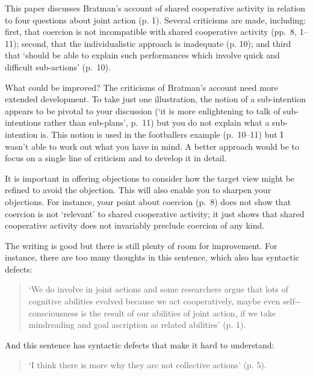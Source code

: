 \documentclass[12pt,a4paper]{extarticle}
\begin{document}
\setlength\footnotesep{1em}


\author{}
\date{}


\maketitle


This paper discusses Bratman’s account of shared cooperative activity in relation to four questions about joint action (p. 1).  
Several criticisms are made, including: first, that coercion is not  incompatible with shared cooperative activity (pp.\ 8, 1--11); second, that the individualistic approach is inadequate (p. 10); and third that ‘should be able to explain such performances which involve quick and difficult sub-actions’ (p.\ 10).

What could be improved? 
The criticisms of Bratman’s account need more extended development.
To take just one illustration, the notion of a sub-intention appears to be pivotal to your discussion (‘it is more enlightening to talk of sub-intentions rather than sub-plans’, p.\ 11) but you do not explain what a sub-intention is.
This notion is used in the footballers example (p.\ 10--11) but I wasn’t able to work out what you have in mind.
A better approach would be to focus on a single line of criticism and to develop it in detail.

It is important in offering objections to consider how the target view might be refined to avoid the objection.
This will also enable you to sharpen your objections.
For instance, your point about coercion (p.\ 8) does not show that coercion is not ‘relevant’ to shared cooperative activity; it just shows that shared cooperative activity does not invariably preclude coercion of any kind.

The writing is good but there is still plenty of room for improvement.
For instance, there are too many thoughts in this sentence, which also has syntactic defects:
\begin{quote}
‘We do involve in joint actions and some researchers argue that lots of cognitive abilities evolved because we act cooperatively, maybe even self-­‐consciousness is the result of our abilities of joint action, if we take mindreading and goal ascription as related abilities’  (p. 1).
\end{quote}
And this sentence has syntactic defects that make it hard to understand:
\begin{quote}
‘I think there is more why they are not collective actions’ (p. 5).
\end{quote}
\end{document}
